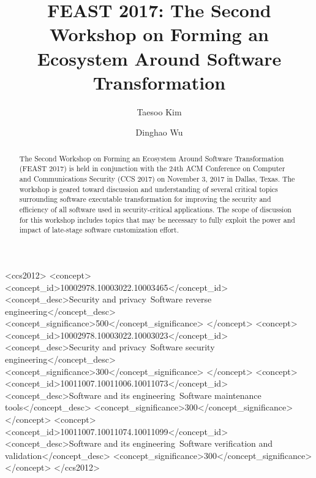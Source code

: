 \documentclass[sigconf]{acmart}
\begin{document}
\title{FEAST 2017: The Second Workshop on Forming an Ecosystem Around Software Transformation}


\author{Taesoo Kim}

\author{Dinghao Wu}


\renewcommand{\shortauthors}{Taesoo Kim and Dinghao Wu}


\begin{abstract}
The Second Workshop on Forming an Ecosystem
Around Software Transformation (FEAST 2017)
is held in conjunction with the 24th ACM
Conference on Computer and Communications
Security (CCS 2017) on November 3, 2017 in Dallas, Texas. The
workshop is geared toward discussion and
understanding of several critical topics surrounding
software executable transformation for improving
the security and efficiency of all software used in
security-critical applications. The scope of
discussion for this workshop includes topics that
may be necessary to fully exploit the power and
impact of late-stage software customization effort.
\end{abstract}



%
%
\begin{CCSXML}
<ccs2012>
<concept>
<concept_id>10002978.10003022.10003465</concept_id>
<concept_desc>Security and privacy~Software reverse engineering</concept_desc>
<concept_significance>500</concept_significance>
</concept>
<concept>
<concept_id>10002978.10003022.10003023</concept_id>
<concept_desc>Security and privacy~Software security engineering</concept_desc>
<concept_significance>300</concept_significance>
</concept>
<concept>
<concept_id>10011007.10011006.10011073</concept_id>
<concept_desc>Software and its engineering~Software maintenance tools</concept_desc>
<concept_significance>300</concept_significance>
</concept>
<concept>
<concept_id>10011007.10011074.10011099</concept_id>
<concept_desc>Software and its engineering~Software verification and validation</concept_desc>
<concept_significance>300</concept_significance>
</concept>
</ccs2012>
\end{CCSXML}
\end{document}
